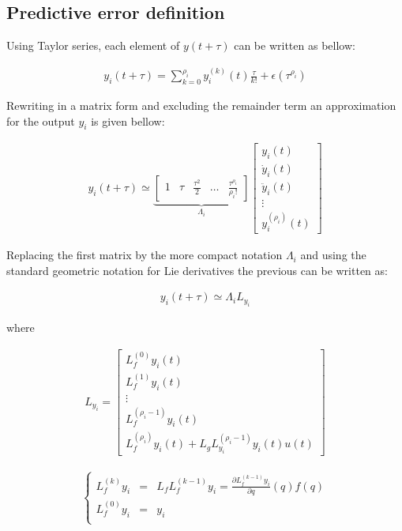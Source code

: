 \documentclass[letterpaper, 10 pt, conference]{ieeeconf}  %
\begin{document}
\subsection{Predictive error definition}

Using Taylor series, each element of ${y(t+\tau)}$ can be written as bellow:

\begin{align*}
y_i(t+\tau) = \sum_{k=0}^{\rho_i} 
y^{(k)}_i(t)\frac{\tau}{k!} + \epsilon(\tau^{\rho_i})
\end{align*}

Rewriting in a matrix form and excluding the remainder term an approximation for the output $y_i$ is given bellow:

\begin{eqnarray}
y_i(t+\tau) \simeq \underbrace{\left[\begin{array}{ccccc}
1 & \tau & \frac{\tau^2}{2} & \dots & \frac{\tau^{\rho_i}}{{\rho_i}!}
\end{array}\right]}_{\Lambda_i}
\left[\begin{array}{c}
y_i(t)\\
\dot{y}_i(t)\\
\ddot{y}_i(t)\\
\vdots\\
y^{(\rho_i)}_i(t)
\end{array}\right]
\end{eqnarray}

Replacing the first matrix by the more compact notation $\Lambda_i$ and using the standard geometric notation for Lie derivatives the previous can be written as:

\begin{eqnarray}
y_i(t+\tau) \simeq \Lambda_i L_{y_i}
\end{eqnarray}

where

\begin{eqnarray*}
L_{y_i} = \left[\begin{array}{c}
L_f^{(0)}y_i(t)\\
L_f^{(1)}y_i(t)\\
\vdots\\
L^{({\rho_i}-1)}_fy_i(t)\\
L^{({\rho_i})}_fy_i(t)+L_gL_{y_i}^{({\rho_i}-1)}y_i(t)u(t)
\end{array}\right]
\end{eqnarray*}


\begin{eqnarray*}
\left\lbrace\begin{array}{lcl}
L_f^{(k)} y_i & = & L_fL_f^{(k-1)}y_i = \frac{\partial L_f^{(k-1)}y_i}{\partial q}(q)f(q)\\
L_f^{(0)}y_i & = & y_i\\
\end{array}\right.
\end{eqnarray*}
\end{document}
